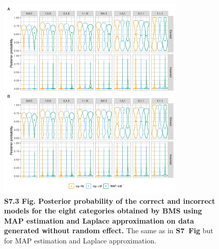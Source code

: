 \documentclass[11pt]{article}
\newcommand{\sfigppmcmcone}{\textbf{S7~Fig}\xspace}
\begin{document}
\begin{figure}[!ht]
\begin{center}
  \includegraphics[width=0.8\textwidth]{png/sim_vln_map_lap1.png}
\end{center}  
\caption{
  {\bf
    S7.3 Fig.
    Posterior probability of the correct and incorrect models for the eight categories obtained by BMS using MAP estimation and Laplace approximation on data generated without random effect.}
The same as in \sfigppmcmcone but for MAP estimation and Laplace approximation.
}
\label{s-fig:sim-vln-map1}
\end{figure}
\end{document}
